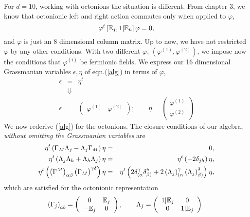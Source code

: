 \documentclass[a4paper,12pt]{book}
\begin{document}
For $d=10$, working with octonions the situation is different. From chapter
3, we know that octonionic left and right action commutes only when applied
to $\varphi $, 
\begin{equation}
\varphi ^{t}\left[ \Bbb{E}_{j},1|\Bbb{E}_{h}\right] \varphi =0,
\end{equation}
and $\varphi $ is just an 8 dimensional column matrix. Up to now, we have
not restricted $\varphi $ by any other conditions. With two different $%
\varphi $, $\left( \varphi ^{\left( 1\right) },\varphi ^{\left( 2\right)
}\right) $, we impose now the conditions that $\varphi ^{\left( i\right) }$
be fermionic fields. We express our 16 dimensional Grassmanian variables $%
\epsilon ,\eta $ of eqn.(\ref{alg}) in terms of $\varphi $, 
\begin{eqnarray}
\epsilon &=&\eta ^{t}  \nonumber \\
&\Downarrow &  \nonumber \\
\epsilon &=&\left( 
\begin{array}{ll}
\varphi ^{\left( 1\right) } & \varphi ^{\left( 2\right) }
\end{array}
\right) ;\quad \quad \eta =\left( 
\begin{array}{l}
\varphi ^{\left( 1\right) } \\ 
\varphi ^{\left( 2\right) }
\end{array}
\right)  \label{cond1}
\end{eqnarray}
We now rederive (\ref{alg}) for the octonions. The closure conditions of our
algebra, \emph{without omitting the Grassmanian variables} are 
\begin{eqnarray}
\eta ^{t}\left( \Gamma _{M}\Lambda _{j}-\Lambda _{j}\Gamma _{M}\right) \eta
&=&0,  \nonumber \\
\eta ^{t}\left( \Lambda _{j}\Lambda _{h}+\Lambda _{h}\Lambda _{j}\right)
\eta &=&\eta ^{t}\left( -2\delta _{jh}\right) \eta ,  \nonumber \\
\eta ^{t}\left( \left( \Gamma ^{M}\right) _{\alpha \beta }\left( \tilde{%
\Gamma}_{M}\right) ^{\gamma \delta }\right) \eta &=&\eta ^{t}\left( 2\delta
_{(\alpha }^{\gamma }\delta _{\beta )}^{\delta }+2\left( \Lambda _{j}\right)
_{(\alpha }^{\gamma }\left( \Lambda _{j}\right) _{\beta )}^{\delta }\right)
\eta ,  \label{algoct}
\end{eqnarray}
which are satisfied for the octonionic representation 
\begin{equation}
\left( \Gamma _{j}\right) _{ab}=\left( 
\begin{array}{cc}
0 & \Bbb{E}_{j} \\ 
-\Bbb{E}_{j} & 0
\end{array}
\right) ,\quad \quad \Lambda _{j}=\left( 
\begin{array}{cc}
1|\Bbb{E}_{j} & 0 \\ 
0 & 1|\Bbb{E}_{j}
\end{array}
\right) .
\end{equation}
\end{document}
